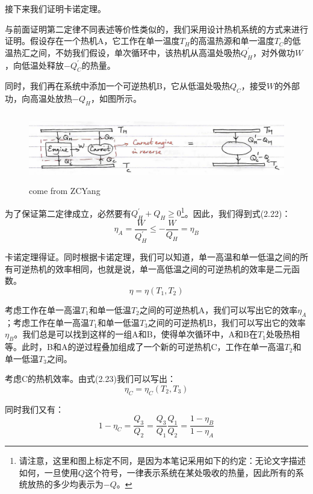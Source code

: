 \documentclass[a4paper, 10pt, openany]{book}%
\begin{document}
接下来我们证明卡诺定理。

与前面证明第二定律不同表述等价性类似的，我们采用设计热机系统的方式来进行证明。假设存在一个热机A，它工作在单一温度$T_H$的高温热源和单一温度$T_C$的低温热汇之间，不妨我们假设，单次循环中，该热机从高温处吸热$Q_H^\prime$，对外做功$W$，向低温处释放$-Q_C^\prime$的热量。

同时，我们再在系统中添加一个可逆热机B，它从低温处吸热$Q_C$，接受$W$的外部功，向高温处放热$-Q_H$，如图所示。
\begin{figure}[h]
  \centering 
  \includegraphics[height=3.0cm]{5.png}
  
  \caption{come from ZCYang}
  
  
  \end{figure}

为了保证第二定律成立，必然要有$Q_H^\prime+Q_H\geq0$\footnote{请注意，这里和图上标定不同，是因为本笔记采用如下的约定：无论文字描述如何，一旦使用$Q$这个符号，一律表示系统在某处吸收的热量，因此所有的系统放热的多少均表示为$-Q$。}。因此，我们得到式(2.22)：
\begin{equation}
  \eta_A=\frac{W}{Q_H^\prime}\leq-\frac{W}{Q_H}=\eta_B
\end{equation}

卡诺定理得证。同时根据卡诺定理，我们可以知道，单一高温和单一低温之间的所有可逆热机的效率相同，也就是说，单一高低温之间的可逆热机的效率是二元函数。
\begin{equation}
  \eta=\eta(T_1,T_2)
\end{equation}

考虑工作在单一高温$T_1$和单一低温$T_2$之间的可逆热机A，我们可以写出它的效率$\eta_A$；考虑工作在单一高温$T_1$和单一低温$T_3$之间的可逆热机B，我们可以写出它的效率$\eta_B$。我们总是可以找到这样的一组A和B，使得单次循环中，A和B在$T_1$处吸热相等。此时，B和A的逆过程叠加组成了一个新的可逆热机C，工作在单一高温$T_2$和单一低温$T_3$之间。

考虑C的热机效率。由式(2.23)我们可以写出：
\begin{equation}
  \eta_C=\eta_C(T_2,T_3)
\end{equation}

同时我们又有：
\begin{equation}
 1- \eta_C=\frac{Q_3}{Q_2}=\frac{Q_3}{Q_1}\frac{Q_1}{Q_2}=\frac{1-\eta_B}{1-\eta_A}
\end{equation}
\end{document}
